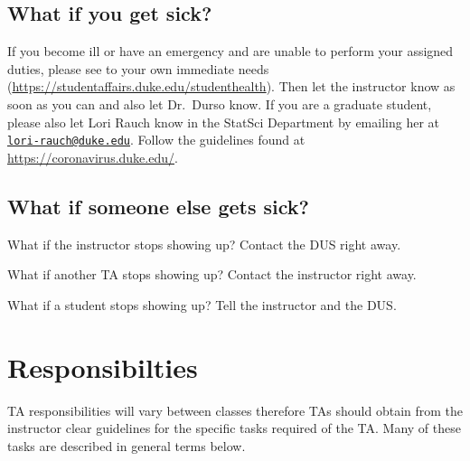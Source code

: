 \documentclass[
]{article}
\begin{document}
\hypertarget{what-if-you-get-sick}{%
\subsection{What if you get sick?}\label{what-if-you-get-sick}}

If you become ill or have an emergency and are unable to perform your assigned duties, please see to your own immediate needs (\url{https://studentaffairs.duke.edu/studenthealth}). Then let the instructor know as soon as you can and also let Dr.~Durso know. If you are a graduate student, please also let Lori Rauch know in the StatSci Department by emailing her at \href{mailto:lori-rauch@duke.edu}{\nolinkurl{lori-rauch@duke.edu}}. Follow the guidelines found at \url{https://coronavirus.duke.edu/}.

\hypertarget{what-if-someone-else-gets-sick}{%
\subsection{What if someone else gets sick?}\label{what-if-someone-else-gets-sick}}

What if the instructor stops showing up? Contact the DUS right away.

What if another TA stops showing up? Contact the instructor right away.

What if a student stops showing up? Tell the instructor and the DUS.

\hypertarget{responsibilties}{%
\section{Responsibilties}\label{responsibilties}}

TA responsibilities will vary between classes therefore TAs should obtain from the instructor clear guidelines for the specific tasks required of the TA. Many of these tasks are described in general terms below.
\end{document}
